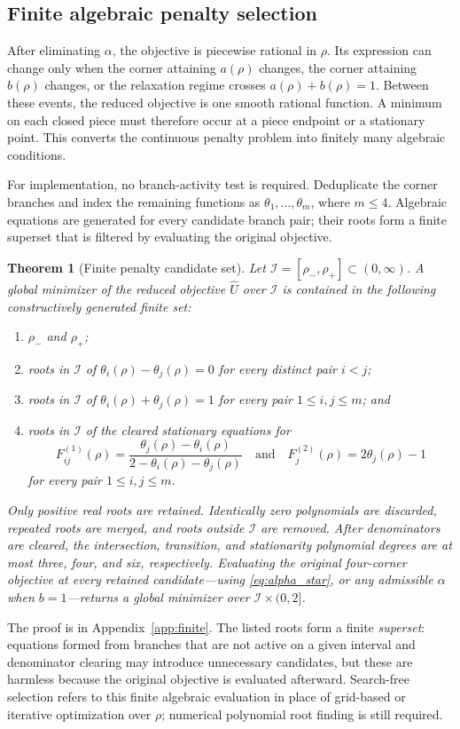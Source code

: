 \documentclass[11pt]{article}
\newtheorem{theorem}{Theorem}[section]
\theoremstyle{definition}
\begin{document}
\subsection{Finite algebraic penalty selection}
After eliminating $\alpha$, the objective is piecewise rational in $\rho$.
Its expression can change only when the corner attaining $a(\rho)$ changes,
the corner attaining $b(\rho)$ changes, or the relaxation regime crosses
$a(\rho)+b(\rho)=1$. Between these events, the reduced objective is one smooth
rational function. A minimum on each closed piece must therefore occur at a
piece endpoint or a stationary point. This converts the continuous penalty
problem into finitely many algebraic conditions.

For implementation, no branch-activity test is required. Deduplicate the
corner branches and index the remaining functions as
$\theta_1,\ldots,\theta_m$, where $m\le4$. Algebraic equations are generated
for every candidate branch pair; their roots form a finite superset that is
filtered by evaluating the original objective.

\begin{theorem}[Finite penalty candidate set]\label{thm:finite}
Let $\mathcal I=[\rho_-,\rho_+]\subset(0,\infty)$. A global minimizer of the
reduced objective $\widehat U$ over $\mathcal I$ is contained in the following
constructively generated finite set:
\begin{enumerate}
\item $\rho_-$ and $\rho_+$;
\item roots in $\mathcal I$ of
$\theta_i(\rho)-\theta_j(\rho)=0$ for every distinct pair $i<j$;
\item roots in $\mathcal I$ of
$\theta_i(\rho)+\theta_j(\rho)=1$ for every pair $1\le i,j\le m$; and
\item roots in $\mathcal I$ of the cleared stationary equations for
\[
F_{ij}^{(1)}(\rho)=
\frac{\theta_j(\rho)-\theta_i(\rho)}
{2-\theta_i(\rho)-\theta_j(\rho)}
\quad\text{and}\quad
F_j^{(2)}(\rho)=2\theta_j(\rho)-1
\]
for every pair $1\le i,j\le m$.
\end{enumerate}
Only positive real roots are retained. Identically zero polynomials are
discarded, repeated roots are merged, and roots outside $\mathcal I$ are
removed. After denominators are cleared, the intersection, transition, and
stationarity polynomial degrees are at most three, four, and six,
respectively. Evaluating the original four-corner objective at every retained
candidate---using \eqref{eq:alpha_star}, or any admissible $\alpha$ when
$b=1$---returns a global minimizer over
$\mathcal I\times(0,2]$.
\end{theorem}
The proof is in Appendix~\ref{app:finite}. The listed roots form a finite
\emph{superset}: equations formed from branches that are not active on a given
interval and denominator clearing may introduce unnecessary candidates, but
these are harmless because the original objective is evaluated afterward.
Search-free selection refers to this finite algebraic evaluation in place of
grid-based or iterative optimization over $\rho$; numerical polynomial root
finding is still required.
\end{document}

